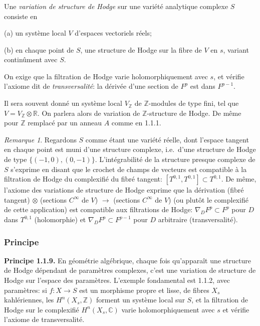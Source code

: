 \documentclass[12pt,a4paper]{article}
\theoremstyle{plain}
\theoremstyle{definition}
\theoremstyle{remark}
\newtheorem{remark}[theorem]{Remarque}
\newcommand{\ZZ}{\mathbb{Z}}
\newcommand{\RR}{\mathbb{R}}
\newcommand{\CC}{\mathbb{C}}
\begin{document}
\subsubsection{}

Une \textit{variation de structure de Hodge} sur une vari\'et\'e analytique complexe $S$ consiste en

(a) un syst\`eme local $V$ d'espaces vectoriels r\'eels;

(b) en chaque point de $S$, une structure de Hodge sur la fibre de $V$ en $s$, variant contin\^ument avec $S$.

On exige que la filtration de Hodge varie holomorphiquement avec $s$, et v\'erifie l'axiome dit de \textit{transversalit\'e}: la d\'eriv\'ee d'une section de $F^p$ est dans $F^{p-1}$.

Il sera souvent donn\'e un syst\`eme local $V_{\ZZ}$ de $\ZZ$-modules de type fini, tel que $V = V_{\ZZ} \otimes \RR$. On parlera alors de variation de $\ZZ$-structure de Hodge. De m\^eme pour $\ZZ$ remplac\'e par un anneau $A$ comme en 1.1.1.

\begin{remark}
Regardons $S$ comme \'etant une vari\'et\'e r\'eelle, dont l'espace tangent en chaque point est muni d'une structure complexe, i.e.~d'une structure de Hodge de type $\{(-1,0),(0,-1)\}$. L'int\'egrabilit\'e de la structure presque complexe de $S$ s'exprime en disant que le crochet de champs de vecteurs est compatible \`a la filtration de Hodge du complexifi\'e du fibr\'e tangent: $[T^{0,1}, T^{0,1}] \subset T^{0,1}$. De m\^eme, l'axiome des variations de structure de Hodge exprime que la d\'erivation (fibr\'e tangent) $\otimes$ (sections $C^{\infty}$ de $V$) $\to$ (sections $C^{\infty}$ de $V$) (ou plut\^ot le complexifi\'e de cette application) est compatible aux filtrations de Hodge: $\nabla_D F^p \subset F^p$ pour $D$ dans $T^{0,1}$ (holomorphie) et $\nabla_D F^p \subset F^{p-1}$ pour $D$ arbitraire (transversalit\'e).
\end{remark}

\subsubsection{Principe}

\textbf{Principe 1.1.9.} En g\'eom\'etrie alg\'ebrique, chaque fois qu'appara\^it une structure de Hodge d\'ependant de param\`etres complexes, c'est une variation de structure de Hodge sur l'espace des param\`etres. L'exemple fondamental est 1.1.2, avec param\`etres: si $f:X \to S$ est un morphisme propre et lisse, de fibres $X_s$ kahl\'eriennes, les $H^n(X_s,\ZZ)$ forment un syst\`eme local sur $S$, et la filtration de Hodge sur le complexifi\'e $H^n(X_s,\CC)$ varie holomorphiquement avec $s$ et v\'erifie l'axiome de transversalit\'e.
\end{document}
